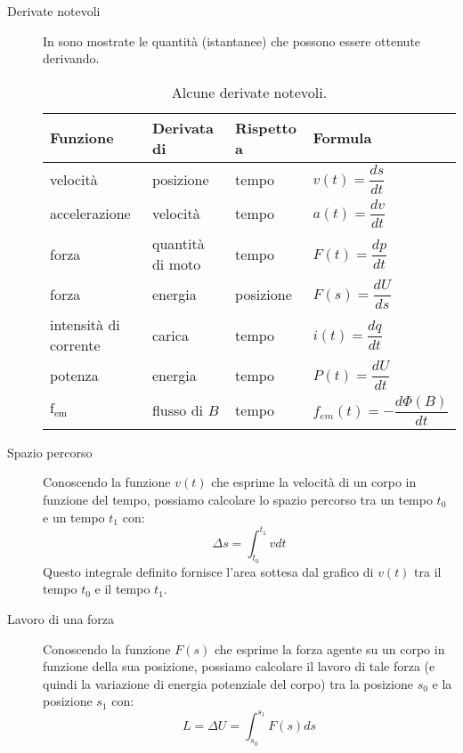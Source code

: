 \documentclass[a4paper,11pt,italian]{article}
\begin{document}
\begin{description}
  \item[Derivate notevoli]
  In  sono mostrate le quantità (istantanee) che possono essere ottenute derivando.
  
  \begin{table}[hbtp]\centering
  \begin{tabular}{llll}\toprule
    \textbf{Funzione} & \textbf{Derivata di} & \textbf{Rispetto a} & \textbf{Formula} \\\midrule
    velocità          & posizione            & tempo               & $ v(t) = \dfrac{ds}{dt} $ \\\addlinespace[.8em]
    accelerazione     & velocità             & tempo               & $ a(t) = \dfrac{dv}{dt} $ \\\addlinespace[.8em]
    forza             & quantità di moto     & tempo               & $ F(t) = \dfrac{dp}{dt} $ \\\addlinespace[.8em]
    forza             & energia              & posizione           & $ F(s) = \dfrac{dU}{ds} $ \\\addlinespace[.8em]
    intensità di corrente & carica           & tempo               & $ i(t) = \dfrac{dq}{dt} $ \\\addlinespace[.8em]
    potenza           & energia              & tempo               & $ P(t) = \dfrac{dU}{dt} $ \\\addlinespace[.8em]
    $ \textrm{f}_{\textrm{em}} $ & flusso di $ B $ & tempo         & $ f_{em}(t) = -\dfrac{d\Phi(B)}{dt} $ \\\bottomrule
  \end{tabular}
  \caption{Alcune derivate notevoli.}
  \label{tab:derivatenotevoli}
  \end{table}
  
  \item[Spazio percorso]
  Conoscendo la funzione $ v(t) $ che esprime la velocità di un corpo in funzione del tempo, 
  possiamo calcolare lo spazio percorso tra un tempo $ t_0 $ e un tempo $ t_1 $ con:
  \[ \Delta s = \int_{t_0}^{t_1} v dt \]
  Questo integrale definito fornisce l'area sottesa dal grafico di $ v(t) $ tra il tempo $ t_0 $ e il tempo $ t_1 $.
  
  \item[Lavoro di una forza]
  Conoscendo la funzione $ F(s) $ che esprime la forza agente su un corpo in funzione della sua posizione, 
  possiamo calcolare il lavoro di tale forza (e quindi la variazione di energia potenziale del corpo) tra la posizione $ s_0 $ e la posizione $ s_1 $ con:
  \[ L = \Delta U = \int_{s_0}^{s_1} F(s) ds \]
  

\end{description}
\end{document}
